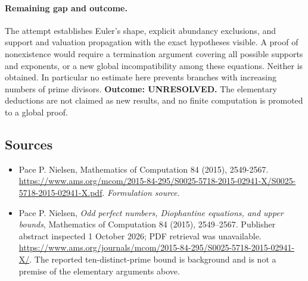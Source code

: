 \documentclass[11pt]{article}
\begin{document}
\paragraph{Remaining gap and outcome.}
The attempt establishes Euler's shape, explicit abundancy exclusions,
and support and valuation propagation with the exact hypotheses visible.
A proof of nonexistence would require a termination argument covering
all possible supports and exponents, or a new global incompatibility
among these equations. Neither is obtained. In particular no estimate
here prevents branches with increasing numbers of prime divisors.
\textbf{Outcome: UNRESOLVED.} The elementary deductions are not claimed
as new results, and no finite computation is promoted to a global proof.

\subsection{Sources}
\begin{itemize}
\item[S1]Pace P. Nielsen, Mathematics of Computation 84 (2015), 2549-2567.
\url{https://www.ams.org/mcom/2015-84-295/S0025-5718-2015-02941-X/S0025-5718-2015-02941-X.pdf}.
\textit{Formulation source.}

\item[E1] Pace P. Nielsen, \emph{Odd perfect numbers, Diophantine
equations, and upper bounds}, Mathematics of Computation 84 (2015),
2549--2567. Publisher abstract inspected 1 October 2026; PDF retrieval
was unavailable. \url{https://www.ams.org/journals/mcom/2015-84-295/S0025-5718-2015-02941-X/}.
The reported ten-distinct-prime bound is background and is not a premise
of the elementary arguments above.

\end{itemize}
\end{document}
